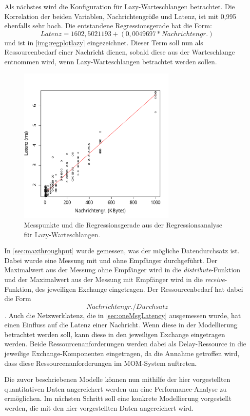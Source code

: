 Als nächstes wird die Konfiguration für Lazy-Warteschlangen betrachtet. Die Korrelation der beiden Variablen, Nachrichtengröße und Latenz, ist mit 0,995 ebenfalls sehr hoch. Die entstandene Regressionsgerade hat die Form: \[Latenz = 1602,5021193 + (0,0049697 * Nachrichtengr.)\] und ist in \autoref{img:regplotlazy} eingezeichnet. Dieser Term soll nun als Ressourcenbedarf einer Nachricht dienen, sobald diese aus der Warteschlange entnommen wird, wenn Lazy-Warteschlangen betrachtet werden sollen.
\begin{figure}
\center
  \includegraphics[width=0.7\textwidth]{images/modelling/oneMsgLazyRegression.pdf}
  \caption{Messpunkte und die Regressionsgerade aus der Regressionsanalyse für Lazy-Warteschlangen.}
  \label{img:regplotlazy}
\end{figure}

In \autoref{sec:maxthroughput} wurde gemessen, was der mögliche Datendurchsatz ist. Dabei wurde eine Messung mit und ohne Empfänger durchgeführt. Der Maximalwert aus der Messung ohne Empfänger wird in die \emph{distribute}-Funktion und der Maximalwert aus der Messung mit Empfänger wird in die \emph{receive}-Funktion, des jeweiligen Exchange eingetragen. Der Ressourcenbedarf hat dabei die Form \[Nachrichtengr. /  Durchsatz\]. 
Auch die Netzwerklatenz, die in \autoref{sec:oneMsgLatency} ausgemessen wurde, hat einen Einfluss auf die Latenz einer Nachricht. Wenn diese in der Modellierung betrachtet werden soll, kann diese in den jeweiligen Exchange eingetragen werden. Beide Ressourcenanforderungen werden dabei als Delay-Ressource in die jeweilige Exchange-Komponenten eingetragen, da die Annahme getroffen wird, dass diese Ressourcenanforderungen im MOM-System auftreten. \par
Die zuvor beschriebenen Modelle können nun mithilfe der hier vorgestellten quantitativen Daten angereichert werden um eine Performance-Analyse zu ermöglichen. Im nächsten Schritt soll eine konkrete Modellierung vorgestellt werden, die mit den hier vorgestellten Daten angereichert wird. 

